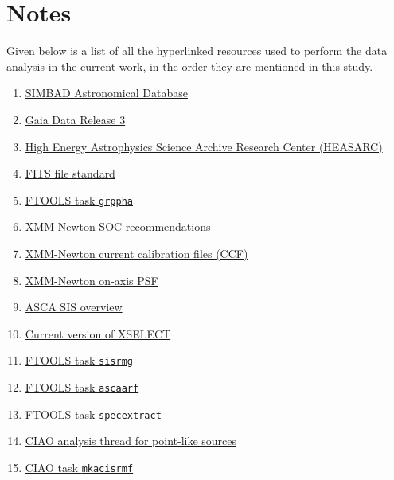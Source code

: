 \section*{Notes}
	Given below is a list of all the hyperlinked resources used to perform the data analysis in the current work, in the order they are mentioned in this study.
	\begin{enumerate}[1]%
		\setlength{\itemsep}{0pt}
		\item \href{http://simbad.u-strasbg.fr/simbad/}{SIMBAD Astronomical Database}
		\item \href{https://www.cosmos.esa.int/web/gaia/data-release-3}{Gaia Data Release 3}
		\item \href{https://heasarc.gsfc.nasa.gov/db-perl/W3Browse/w3browse.pl}{High Energy Astrophysics Science Archive Research Center (HEASARC)}
		\item \href{https://fits.gsfc.nasa.gov/standard40/fits_standard40aa-le.pdf}{FITS file standard}
		\item \href{https://heasarc.gsfc.nasa.gov/docs/heasarc/caldb/docs/memos/cal_sw_93_010/cal_sw_93_010.pdf}{FTOOLS task \texttt{grppha}}
		\item \href{https://xmmweb.esac.esa.int/docs/documents/CAL-TN-0018.pdf}{XMM-Newton SOC recommendations}
		\item \href{https://www.cosmos.esa.int/web/xmm-newton/current-calibration-files}{XMM-Newton current calibration files (CCF)}
		\item \href{https://xmm-tools.cosmos.esa.int/external/xmm_user_support/documentation/uhb/onaxisxraypsf.html}{XMM-Newton on-axis PSF}
		\item \href{https://heasarc.gsfc.nasa.gov/docs/asca/newsletters/sis_overview.html}{ASCA SIS overview}
		\item \href{https://heasarc.gsfc.nasa.gov/ftools/xselect/}{Current version of XSELECT}
		\item \href{https://heasarc.gsfc.nasa.gov/lheasoft/ftools/fhelp/sisrmg.html}{FTOOLS task \texttt{sisrmg}}
		\item \href{https://heasarc.gsfc.nasa.gov/lheasoft/ftools/fhelp/ascaarf.html}{FTOOLS task \texttt{ascaarf}}
		\item \href{https://cxc.cfa.harvard.edu/ciao/ahelp/specextract.html}{FTOOLS task \texttt{specextract}}
		\item \href{https://cxc.cfa.harvard.edu/ciao/threads/pointlike/}{CIAO analysis thread for point-like sources}
		\item \href{https://cxc.cfa.harvard.edu/ciao/ahelp/mkacisrmf.html}{CIAO task \texttt{mkacisrmf}}

\end{enumerate}
